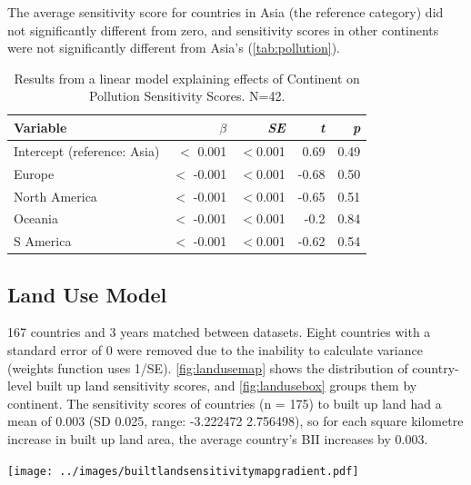 \documentclass[11pt, a4paper, titlepage]{article}
\begin{document}
	The average sensitivity score for countries in Asia (the reference category) did not significantly different from zero, and sensitivity scores in other continents were not significantly different from Asia's (\autoref{tab:pollution}).
	
		\begin{table}[h!]
		\begin{center}
			\caption{Results from a linear model explaining effects of Continent on Pollution Sensitivity Scores. \textmd{ N=42.}}
			\label{tab:pollution}
			\begin{tabular}{l|r|r|r|r} %
				Variable & $\beta$ & \textit{SE} & \textit{t} & \textit{p}\\
				\hline
				Intercept (reference: Asia) & $<$ 0.001 & $<$0.001 & 0.69 & 0.49\\
				Europe & $<$ -0.001 & $<$0.001 & -0.68 & 0.50 \\
				North America & $<$ -0.001 & $<$0.001 & -0.65 & 0.51\\
				Oceania & $<$ -0.001 & $<$0.001 & -0.2 & 0.84\\
				S America & $<$ -0.001 & $<$0.001 & -0.62 & 0.54\\
			\end{tabular}
		\end{center}
	\end{table}

\newpage
	\subsection*{Land Use Model}
	
	167 countries and 3 years matched between datasets. Eight countries with a standard error of 0 were removed due to the inability to calculate variance (weights function uses 1/SE).  \autoref{fig:landusemap} shows the distribution of country-level built up land sensitivity scores, and \autoref{fig:landusebox} groups them by continent. The sensitivity scores of countries (n = 175) to built up land had a mean of 0.003 (SD 0.025, range: -3.222472  2.756498), so for each square kilometre increase in built up land area, the average country's BII increases by 0.003.\newline
	
	\texttt{[image: ../images/builtlandsensitivitymapgradient.pdf]}
	\label{fig:landusemap}
	
\end{document}
